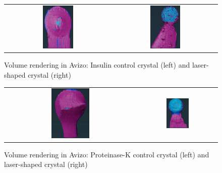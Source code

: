 \begin{figure}[h]
    \begin{tabular}{cc}
	\includegraphics[width=0.3\textwidth]{images/avizo_flats/ins_con.jpg} & \includegraphics[width=0.3\textwidth]{images/avizo_flats/ins_ls.jpg}
    \end{tabular}
	\caption{Volume rendering in Avizo: Insulin control crystal (left) and laser-shaped crystal (right)}
 \label{avizo_insulin}
\end{figure}


\begin{figure}
    \begin{tabular}{cc}
	\includegraphics[width=0.3\textwidth]{images/avizo_flats/prot_con.png} & \includegraphics[width=0.3\textwidth]{images/avizo_flats/prot_ls.jpg}
    \end{tabular}
    \caption{Volume rendering in Avizo: Proteinase-K control crystal (left) and laser-shaped crystal (right)}
\end{figure}


